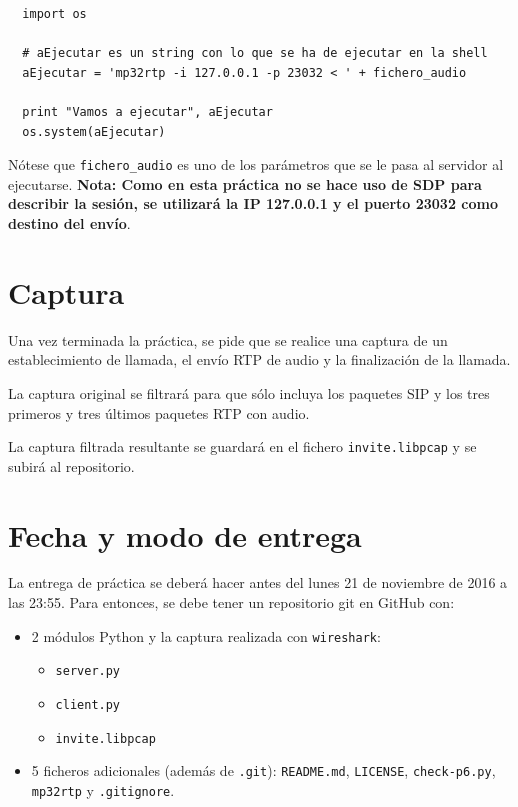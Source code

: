 \documentclass[a4paper,11pt]{article}
\begin{document}
\begin{verbatim}
  import os

  # aEjecutar es un string con lo que se ha de ejecutar en la shell
  aEjecutar = 'mp32rtp -i 127.0.0.1 -p 23032 < ' + fichero_audio 

  print "Vamos a ejecutar", aEjecutar
  os.system(aEjecutar)
\end{verbatim}

Nótese que \texttt{fichero\_audio} es uno de los parámetros que se le pasa al servidor al ejecutarse. {\bf Nota: Como en esta práctica no se hace uso de SDP para 
describir la sesión, se utilizará la IP 127.0.0.1 y el puerto 23032 como
destino del envío}.

\section*{Captura}

Una vez terminada la práctica, se pide que se realice una captura de un
establecimiento de llamada, el envío RTP de audio y la finalización de
la llamada. 

La captura original se filtrará para que sólo incluya los paquetes
SIP y los tres primeros y tres últimos paquetes RTP con audio.

La captura filtrada resultante se guardará en el fichero \texttt{invite.libpcap}
y se subirá al repositorio.


\section*{Fecha y modo de entrega}

La entrega de práctica se deberá hacer antes del lunes 21 de noviembre de 2016 a las 23:55. Para entonces, se debe tener un repositorio git en GitHub con: 

    \begin{itemize}
        \item 2 módulos Python y la captura realizada con \texttt{wireshark}:
    \begin{itemize}
      \item \texttt{server.py}
      \item \texttt{client.py}
      \item \texttt{invite.libpcap}
    \end{itemize}
    \item 5 ficheros adicionales (además de \texttt{.git}): \texttt{README.md}, \texttt{LICENSE}, \texttt{check-p6.py}, \texttt{mp32rtp} y \texttt{.gitignore}.
\end{itemize}
\end{document}
